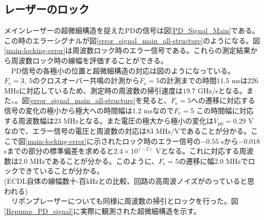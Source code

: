 \documentclass[uplatex, dvipdfmx, a4paper, report, papersize, 11pt]{jsbook}
\begin{document}
\subsection{レーザーのロック}
メインレーザーの超微細構造を捉えたPDの信号は図\ref{PD_Signal_Main}である。この時のエラーシグナルが図\ref{error_signal_main_all-structure}のようになる。図\ref{main-locking-error}は周波数ロック時のエラー信号である。これらの測定結果から周波数ロック時の線幅を評価することができる。\\
　PD信号の各極小の位置と超微細構造の対応は図のようになっている。$F_{\mathrm{e}} = 3,\ 5$のクロスオーバー共鳴の計測から$F_{\mathrm{e}} = 5$の計測までの時間$11.5$ msは$226$ MHzに対応しているため、測定時の周波数の掃引速度は$19.7$ GHz/sとなる。また、。図\ref{error_signal_main_all-structure}を見ると、$F_{\mathrm{e}} = 5$への遷移に対応する信号の変化の極小から極大への時間幅は$1.2$ msなので$F_{\mathrm{e}} = 5$
この時間幅に対応する周波数幅は$23$ MHzとなる。また電圧の極大から極小の変化は$V_{\mathrm{pp}} = 0.29$ Vなので、エラー信号の電圧と周波数の対応は$83$ MHz/Vであることが分かる。ここで図\ref{main-locking-error}に示されたロック時のエラー信号の$-0.55$ sから$-0.018$ sまでの部分の標準偏差を求めると$2.4\times 10^(-2)$ Vとなる。これに対応する周波数は$2.0$ MHzであることが分かる。このように、$F_{\mathrm{e}} = 5$の遷移に幅$2.0$ MHzでロックできていることが分かる。\\
  (ECDL自体の線幅数十-百kHzとの比較、回路の高周波ノイズがのっていると思われる)\\
　リポンプレーザーについても同様に周波数の掃引とロックを行った。図\ref{Repump_PD_signal}に実際に観測された超微細構造を示す。
\end{document}
